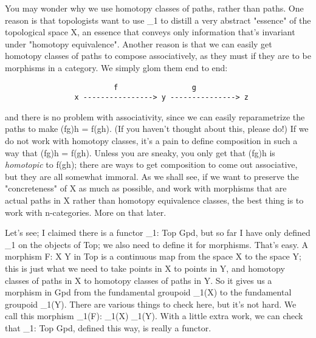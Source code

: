 You may wonder why we use homotopy classes of paths, rather than paths.
One reason is that topologists want to use \Pi _{1} to distill a
very abstract "essence" of the topological space X, an essence
that conveys only information that's invariant under "homotopy
equivalence".  Another reason is that we can easily get homotopy
classes of paths to compose associatively, as they must if they are to
be morphisms in a category.  We simply glom them end to end:

\begin{verbatim}
                         f                 g
                x ----------------> y ---------------> z

\end{verbatim}
    
and there is no problem with associativity, since we can easily
reparametrize the paths to make (fg)h = f(gh).  (If you haven't thought
about this, please do!)  If we do not work with homotopy classes, it's a
pain to define composition in such a way that (fg)h = f(gh).  Unless you
are sneaky, you only get that (fg)h is \emph{homotopic} to f(gh); there are
ways to get composition to come out associative, but they are all somewhat
immoral.  As we shall see, if we want to preserve the "concreteness" 
of X as much as possible, and work with morphisms that are actual paths
in X rather than homotopy equivalence classes, the best thing is to work
with n-categories.  More on that later.

Let's see; I claimed there is a functor \Pi _{1}: Top \to  Gpd,
but so far I have only defined \Pi _{1} on the objects of Top; we
also need to define it for morphisms.  That's easy.  A morphism F: X
\to  Y in Top is a continuous map from the space X to the space Y; this
is just what we need to take points in X to points in Y, and homotopy
classes of paths in X to homotopy classes of paths in Y.  So it gives us
a morphism in Gpd from the fundamental groupoid \Pi _{1}(X) to the
fundamental groupoid \Pi _{1}(Y).  There are various things to
check here, but it's not hard.  We call this morphism \Pi _{1}(F):
\Pi _{1}(X) \to  \Pi _{1}(Y).  With a little extra work, we
can check that \Pi _{1}: Top \to  Gpd, defined this way, is
really a functor.

